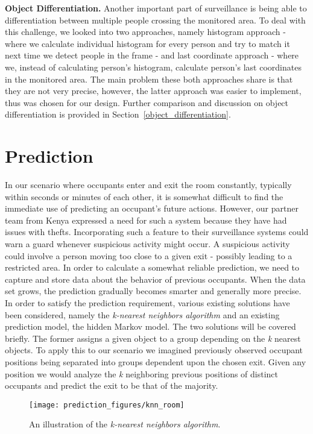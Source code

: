 {\bfseries Object Differentiation.} Another important part of surveillance is being able to differentiation between multiple people crossing the monitored area. To deal with this challenge, we looked into two approaches, namely histogram approach - where we calculate individual histogram for every person and try to match it next time we detect people in the frame - and last coordinate approach - where we, instead of calculating person's histogram, calculate person's last coordinates in the monitored area. The main problem these both approaches share is that they are not very precise, however, the latter approach was easier to implement, thus was chosen for our design. Further comparison and discussion on object differentiation is provided in Section~\ref{object_differentiation}.

\section{Prediction}
\label{sec:analysis_pred}
In our scenario where occupants enter and exit the room constantly, typically within seconds or minutes of each other, it is somewhat difficult to find the immediate use of predicting an occupant's future actions. However, our partner team from Kenya expressed a need for such a system because they have had issues with thefts. Incorporating such a feature to their surveillance systems could warn a guard whenever suspicious activity might occur. A suspicious activity could involve a person moving too close to a given exit - possibly leading to a restricted area. In order to calculate a somewhat reliable prediction, we need to capture and store data about the behavior of previous occupants. When the data set grows, the prediction gradually becomes smarter and generally more precise. In order to satisfy the prediction requirement, various existing solutions have been considered, namely the \emph{k-nearest neighbors algorithm} and an existing prediction model, the hidden Markov model. The two solutions will be covered briefly. The former assigns a given object to a group depending on the \emph{k} nearest objects. To apply this to our scenario we imagined previously observed occupant positions being separated into groups dependent upon the chosen exit. Given any position we would analyze the \emph{k} neighboring previous positions of distinct occupants and predict the exit to be that of the majority.
\begin{figure}
\centering
\texttt{[image: prediction\_figures/knn\_room]}
\caption{An illustration of the \emph{k-nearest neighbors algorithm}.}
\label{fig:knn}
\end{figure}
